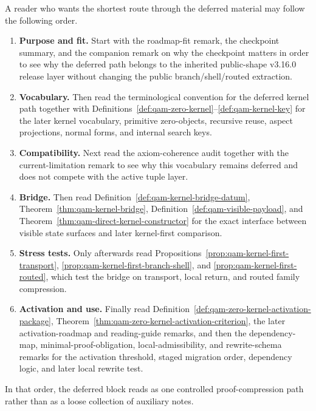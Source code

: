 \begin{remark}\label{rem:qam-zero-kernel-navigation}
A reader who wants the shortest route through the deferred material may follow the following order.
\begin{enumerate}[leftmargin=2em]
  \item \textbf{Purpose and fit.} Start with the roadmap-fit remark, the checkpoint summary, and the companion remark on why the checkpoint matters in order to see why the deferred path belongs to the inherited public-shape v3.16.0 release layer without changing the public branch/shell/routed extraction.
  \item \textbf{Vocabulary.} Then read the terminological convention for the deferred kernel path together with Definitions~\ref{def:qam-zero-kernel}--\ref{def:qam-kernel-key} for the later kernel vocabulary, primitive zero-objects, recursive reuse, aspect projections, normal forms, and internal search keys.
  \item \textbf{Compatibility.} Next read the axiom-coherence audit together with the current-limitation remark to see why this vocabulary remains deferred and does not compete with the active tuple layer.
  \item \textbf{Bridge.} Then read Definition~\ref{def:qam-kernel-bridge-datum}, Theorem~\ref{thm:qam-kernel-bridge}, Definition~\ref{def:qam-visible-payload}, and Theorem~\ref{thm:qam-direct-kernel-constructor} for the exact interface between visible state surfaces and later kernel-first comparison.
  \item \textbf{Stress tests.} Only afterwards read Propositions~\ref{prop:qam-kernel-first-transport}, \ref{prop:qam-kernel-first-branch-shell}, and \ref{prop:qam-kernel-first-routed}, which test the bridge on transport, local return, and routed family compression.
  \item \textbf{Activation and use.} Finally read Definition~\ref{def:qam-zero-kernel-activation-package}, Theorem~\ref{thm:qam-zero-kernel-activation-criterion}, the later activation-roadmap and reading-guide remarks, and then the dependency-map, minimal-proof-obligation, local-admissibility, and rewrite-schema remarks for the activation threshold, staged migration order, dependency logic, and later local rewrite test.
\end{enumerate}
In that order, the deferred block reads as one controlled proof-compression path rather than as a loose collection of auxiliary notes.
\end{remark}

